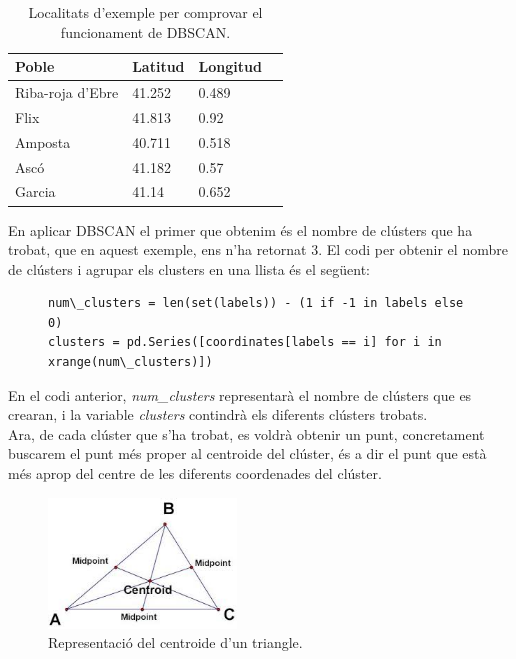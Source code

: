 \documentclass[12pt,a4paper,openright,oneside]{article}
\numberwithin{equation}{section}
\theoremstyle{definition}
\begin{document}
\begin{table}[!htbp]
\begin{center}
	\centering
    \begin{tabular}{| l | l | l | l |}
    \hline
    \textbf{Poble} & \textbf{Latitud} & \textbf{Longitud} \\ \hline
    Riba-roja d'Ebre & 41.252 &  0.489\\ \hline
	Flix & 41.813 & 0.92\\ \hline
	Amposta & 40.711 & 0.518 \\ \hline
	Ascó & 41.182 & 0.57\\ \hline
	Garcia & 41.14 & 0.652\\ \hline
    \end{tabular}
\end{center}
\caption{Localitats d'exemple per comprovar el funcionament de DBSCAN.}
\end{table}
En aplicar DBSCAN el primer que obtenim és el nombre de clústers que ha trobat, que en aquest exemple, ens n'ha retornat 3. El codi per obtenir el nombre de clústers i agrupar els clusters en una llista és el següent:
\newpage
\begin{figure}[!htbp]
\begin{verbatim}
num\_clusters = len(set(labels)) - (1 if -1 in labels else 0)
clusters = pd.Series([coordinates[labels == i] for i in xrange(num\_clusters)])
\end{verbatim}
\end{figure}
En el codi anterior, \emph{num\_clusters} representarà el nombre de clústers que es crearan, i la variable \emph{clusters} contindrà els diferents clústers trobats.\\
Ara, de cada clúster que s'ha trobat, es voldrà obtenir un punt, concretament buscarem el punt més proper al centroide del clúster, és a dir el punt que està més aprop del centre de les diferents coordenades del clúster.
\begin{figure}[htbp]
\centering
\includegraphics[width=5cm]{centroide.jpg}
\caption{Representació del centroide d'un triangle\cite{centroid}.}
\end{figure}
\end{document}
